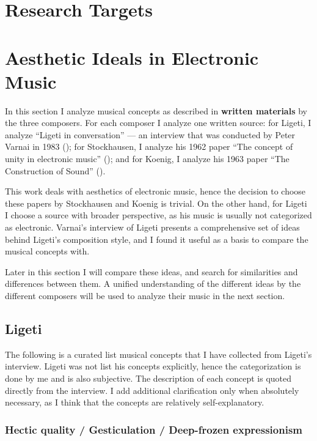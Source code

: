 \documentclass[a4paper,11pt]{article}
\begin{document}
\section{Research Targets}  %
\label{sec:research_targets}

\section{Aesthetic Ideals in Electronic Music}
\label{sec:aesthetic_ideals_in_electronic_music}

In this section I analyze musical concepts as described in \textbf{written materials} by the three composers.
For each composer I analyze one written source:
for Ligeti, I analyze ``Ligeti in conversation'' --- an interview that was conducted by Peter Varnai in 1983 (\cite{varnai});
for Stockhausen, I analyze his 1962 paper ``The concept of unity in electronic music'' (\cite{stockhausen});
and for Koenig, I analyze his 1963 paper ``The Construction of Sound'' (\cite{koenig}).

This work deals with aesthetics of electronic music, hence the decision to choose these papers by Stockhausen and Koenig is trivial.
On the other hand, for Ligeti I choose a source with broader perspective, as his music is usually not categorized as electronic.
Varnai's interview of Ligeti presents a comprehensive set of ideas behind Ligeti's composition style, and I found it useful as a basis to compare the musical concepts with.

Later in this section I will compare these ideas, and search for similarities and differences between them.
A unified understanding of the different ideas by the different composers will be used to analyze their music in the next section.

\subsection{Ligeti}
\label{sub:eshtetic_ligeti}

The following is a curated list musical concepts that I have collected from Ligeti's interview.
Ligeti was not list his concepts explicitly, hence the categorization is done by me and is also subjective.
The description of each concept is quoted directly from the interview.
I add additional clarification only when absolutely necessary, as I think that the concepts are relatively self-explanatory.

\subsubsection{Hectic quality / Gesticulation / Deep-frozen expressionism}
\label{subs:ligeti:hectic}
\end{document}
